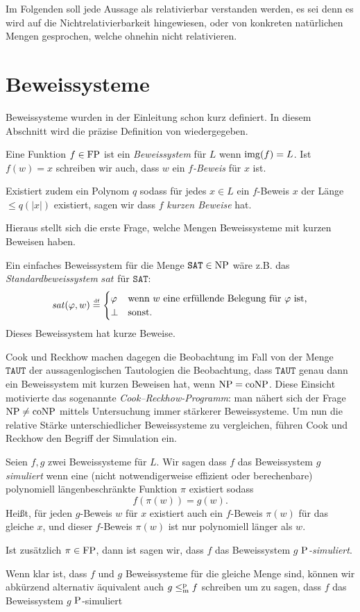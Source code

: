 Im Folgenden soll jede Aussage als relativierbar verstanden werden, es sei denn es wird auf die Nichtrelativierbarkeit hingewiesen, oder von konkreten natürlichen Mengen gesprochen, welche ohnehin nicht relativieren.


\section{Beweissysteme}\label{sec:prelim-ps}

Beweissysteme wurden in der Einleitung schon kurz definiert. In diesem Abschnitt wird die präzise Definition von \textcite{cook_relative_1979} wiedergegeben.
\begin{definition}
Eine Funktion $f\in \FP$ ist ein \emph{Beweissystem} für $L$ wenn $\img(f)=L$.
Ist $f(w)=x$ schreiben wir auch, dass $w$ ein \emph{$f$-Beweis} für $x$ ist.

Existiert zudem ein Polynom $q$ sodass für jedes $x\in L$ ein $f$-Beweis $x$ der Länge $\leq q(|x|)$ existiert, sagen wir dass $f$ \emph{kurzen Beweise} hat.
\end{definition}
Hieraus stellt sich die erste Frage, welche Mengen Beweissysteme mit kurzen Beweisen haben.

Ein einfaches Beweissystem für die Menge $\mathtt{SAT}\in\NP$ wäre z.B. das \emph{Standardbeweissystem} $\mathit{sat}$ für $\mathtt{SAT}$:
\[ \mathit{sat}(\phi, w) \defeq \begin{cases} \phi & \text{wenn $w$ eine erfüllende Belegung für $\phi$ ist,} \\ \bot & \text{sonst.} \end{cases} \]
Dieses Beweissystem hat kurze Beweise.

Cook und Reckhow machen dagegen die Beobachtung im Fall von der Menge $\mathtt{TAUT}$ der aussagenlogischen Tautologien die Beobachtung, dass $\mathtt{TAUT}$ genau dann ein Beweissystem mit kurzen Beweisen hat, wenn $\NP=\coNP$.
Diese Einsicht motivierte das sogenannte \emph{Cook–Reckhow-Programm}: man nähert sich der Frage  $\NP\neq \coNP$ mittels Untersuchung immer stärkerer Beweissysteme.
Um nun die relative Stärke unterschiedlicher Beweissysteme zu vergleichen, führen Cook und Reckhow den Begriff der Simulation ein.
\begin{definition}
    Seien $f,g$ zwei Beweissysteme für $L$. Wir sagen dass $f$ das Beweissystem $g$ \emph{simuliert} wenn eine (nicht notwendigerweise effizient oder berechenbare) polynomiell längenbeschränkte Funktion $\pi$  existiert sodass 
    \[ f(\pi(w))=g(w). \]
    Heißt, für jeden $g$-Beweis $w$ für $x$ existiert auch ein $f$-Beweis $\pi(w)$ für das gleiche $x$, und dieser $f$-Beweis $\pi(w)$ ist nur polynomiell länger als $w$.

    Ist zusätzlich $\pi\in\FP$, dann ist sagen wir, dass $f$ das Beweissystem $g$ \emph{$\P$-simuliert}.
\end{definition}
Wenn klar ist, dass $f$ und $g$ Beweissysteme für die gleiche Menge sind, können wir abkürzend alternativ äquivalent auch $g\leqmp f$ schreiben um zu sagen, dass $f$ das Beweissystem $g$ $\P$-simuliert

